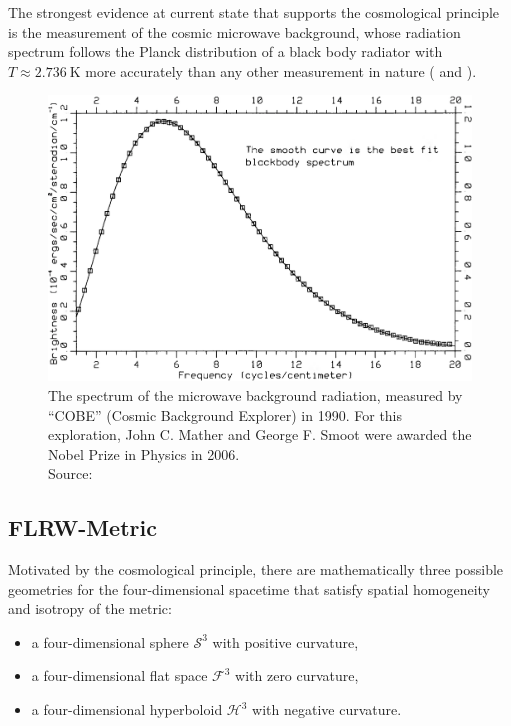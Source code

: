\noindent The strongest evidence at current state that supports the cosmological principle is the measurement of the cosmic microwave background, whose radiation spectrum follows the Planck distribution of a black body radiator with $T \approx \SI{2.736}{\kelvin}$ more accurately than any other measurement in nature (\cite[p.~131/132]{Peebles1993} and \cite{White1999}). 

\begin{figure}[H]
    \centering
    \includegraphics[scale=0.34]{figures/images/cmb-blackbody.png}
    \caption[Caption for LOF]{The spectrum of the microwave background radiation, measured by ``COBE'' (Cosmic Background Explorer) in 1990. For this exploration, John C. Mather and George F. Smoot were awarded the Nobel Prize in Physics in 2006. \\
    Source: \cite[Figure 2]{Mather1990}}
\end{figure}


\subsection{FLRW-Metric}

Motivated by the cosmological principle, there are mathematically three possible geometries for the four-dimensional spacetime that satisfy spatial homogeneity and isotropy of the metric:
\begin{itemize}
    \item a four-dimensional sphere $\mathcal{S}^{3}$ with positive curvature,
    \item a four-dimensional flat space $\mathcal{F}^{3}$ with zero curvature,
    \item a four-dimensional hyperboloid $\mathcal{H}^{3}$ with negative curvature.
\end{itemize}

